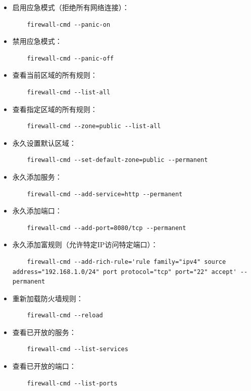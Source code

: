 \documentclass[12pt,UTF8]{ctexbook}
\begin{document}
\begin{itemize}
    \item 启用应急模式（拒绝所有网络连接）：
    \begin{verbatim}
    firewall-cmd --panic-on
    \end{verbatim}
    
    \item 禁用应急模式：
    \begin{verbatim}
    firewall-cmd --panic-off
    \end{verbatim}
    
    \item 查看当前区域的所有规则：
    \begin{verbatim}
    firewall-cmd --list-all
    \end{verbatim}
    
    \item 查看指定区域的所有规则：
    \begin{verbatim}
    firewall-cmd --zone=public --list-all
    \end{verbatim}
    
    \item 永久设置默认区域：
    \begin{verbatim}
    firewall-cmd --set-default-zone=public --permanent
    \end{verbatim}
    
    \item 永久添加服务：
    \begin{verbatim}
    firewall-cmd --add-service=http --permanent
    \end{verbatim}
    
    \item 永久添加端口：
    \begin{verbatim}
    firewall-cmd --add-port=8080/tcp --permanent
    \end{verbatim}
    
    \item 永久添加富规则（允许特定IP访问特定端口）：
    \begin{verbatim}
    firewall-cmd --add-rich-rule='rule family="ipv4" source address="192.168.1.0/24" port protocol="tcp" port="22" accept' --permanent
    \end{verbatim}
    
    \item 重新加载防火墙规则：
    \begin{verbatim}
    firewall-cmd --reload
    \end{verbatim}
    
    \item 查看已开放的服务：
    \begin{verbatim}
    firewall-cmd --list-services
    \end{verbatim}
    
    \item 查看已开放的端口：
    \begin{verbatim}
    firewall-cmd --list-ports
    \end{verbatim}
\end{itemize}
\end{document}
